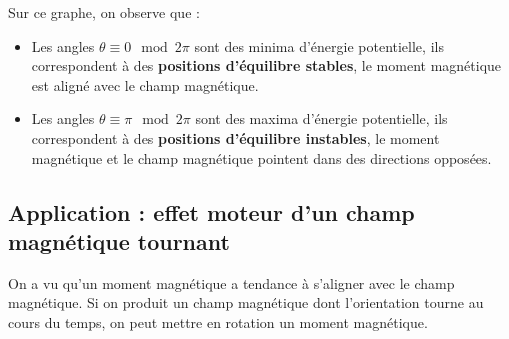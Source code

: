 \documentclass{cours}
\begin{document}
\begin{center}
\end{center}
Sur ce graphe, on observe que :
\begin{itemize}
  \item Les angles $\theta\equiv 0 \mod 2\pi$ sont des minima d'énergie potentielle, ils correspondent à des \textbf{positions d'équilibre stables}, le moment magnétique est aligné avec le champ magnétique.
\item Les angles $\theta \equiv \pi \mod 2\pi$ sont des maxima d'énergie potentielle, ils correspondent à des \textbf{positions d'équilibre instables}, le moment magnétique et le champ magnétique pointent dans des directions opposées.
\end{itemize}

\subsection{Application : effet moteur d'un champ magnétique tournant}%
\label{sub:application_effet_moteur_d_un_champ_magnetique_tournant}

On a vu qu'un moment magnétique a tendance à s'aligner avec le champ magnétique. Si on produit un champ magnétique dont l'orientation tourne au cours du temps, on peut mettre en rotation un moment magnétique.
\end{document}
